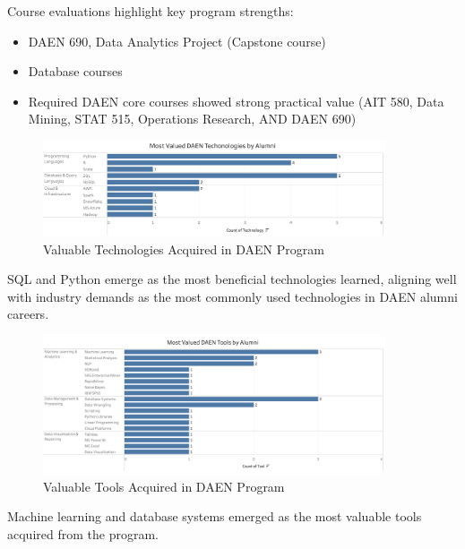 \documentclass[12pt,a4paper]{article}
\begin{document}
Course evaluations highlight key program strengths:
\begin{itemize}
\item DAEN 690, Data Analytics Project (Capstone course)
\item Database courses
\item Required DAEN core courses showed strong practical value (AIT 580, Data Mining, STAT 515, Operations Research, AND DAEN 690)
\end{itemize}
\begin{figure}[H]
    \centering
    \includegraphics[width=0.9\textwidth]{visualizations/daen-technologies.png}
    \caption{Valuable Technologies Acquired in DAEN Program}
    \label{fig:daen-technologies}
\end{figure}

SQL and Python emerge as the most beneficial technologies learned, aligning well with industry demands as the most commonly used technologies in DAEN alumni careers.

\begin{figure}[H]
    \centering
    \includegraphics[width=0.9\textwidth]{visualizations/daen-tools.png}
    \caption{Valuable Tools Acquired in DAEN Program}
    \label{fig:daen-tools}
\end{figure}

Machine learning and database systems emerged as the most valuable tools acquired from the program.
\end{document}
